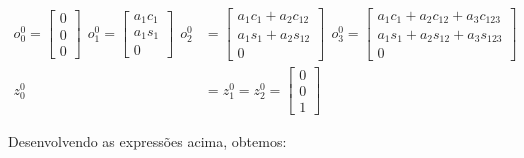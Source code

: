 \begin{align*}
    o_0^0 = \begin{bmatrix}
                0 \\
                0 \\
                0
            \end{bmatrix} \ \ o_1^0 = \begin{bmatrix}
                                          a_1 c_1 \\
                                          a_1 s_1 \\
                                          0
                                      \end{bmatrix} \ \ o_2^0 & = \begin{bmatrix}
                                                                      a_1 c_1 + a_2 c_{12} \\
                                                                      a_1 s_1 + a_2 s_{12} \\
                                                                      0
                                                                  \end{bmatrix} \ \ o_3^0 = \begin{bmatrix}
                                                                                                a_1 c_1 + a_2 c_{12} + a_3 c_{123} \\
                                                                                                a_1 s_1 + a_2 s_{12} + a_3 s_{123} \\
                                                                                                0
                                                                                            \end{bmatrix} \\
    z_0^0                                     & = z_1^0 = z_2^0 = \begin{bmatrix}
                                                                      0 \\
                                                                      0 \\
                                                                      1
                                                                  \end{bmatrix}
\end{align*}

Desenvolvendo as expressões acima, obtemos:

